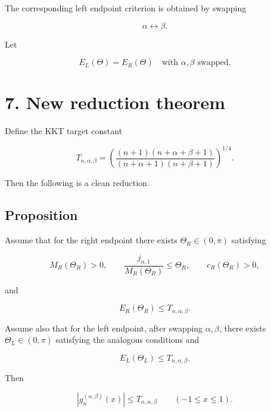 \documentclass[11pt]{article}
\begin{document}
The corresponding left endpoint criterion is obtained by swapping

\begin{equation*}
\alpha\leftrightarrow\beta.
\end{equation*}


Let

\begin{equation*}
E_L(\Theta)
=
E_R(\Theta)
\quad\text{with } \alpha,\beta \text{ swapped.}
\end{equation*}




\section*{7. New reduction theorem}

Define the KKT target constant

\begin{equation*}
\boxed{
T_{n,\alpha,\beta}
=
\left(
\frac{(n+1)(n+\alpha+\beta+1)}
{(n+\alpha+1)(n+\beta+1)}
\right)^{1/4}.
}
\tag{27}
\end{equation*}


Then the following is a clean reduction.

\subsection*{Proposition}

Assume that for the right endpoint there exists \(\Theta_R\in(0,\pi)\) satisfying

\begin{equation*}
M_R(\Theta_R)>0,
\qquad
\frac{j_{\alpha,1}}{M_R(\Theta_R)}\le\Theta_R,
\qquad
c_R(\Theta_R)>0,
\end{equation*}


and

\begin{equation*}
\boxed{
E_R(\Theta_R)\le T_{n,\alpha,\beta}.
}
\tag{28}
\end{equation*}


Assume also that for the left endpoint, after swapping \(\alpha,\beta\), there exists \(\Theta_L\in(0,\pi)\) satisfying the analogous conditions and

\begin{equation*}
\boxed{
E_L(\Theta_L)\le T_{n,\alpha,\beta}.
}
\tag{29}
\end{equation*}


Then

\begin{equation*}
\boxed{
|g_n^{(\alpha,\beta)}(x)|
\le
T_{n,\alpha,\beta}
\qquad (-1\le x\le1).
}
\tag{30}
\end{equation*}
\end{document}
